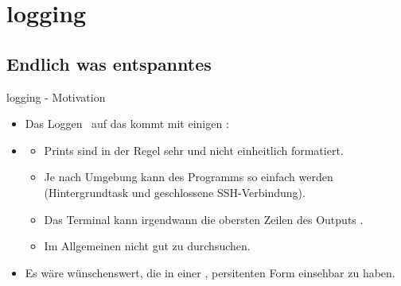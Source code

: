 \documentclass[12pt, aspectratio=169, usepdftitle=false]{beamer}
\newcommand{\pp}[1]{\lpl{#1}}
\begin{document}
\framecardfragen

\section{logging}
\subsection{Endlich was entspanntes}
\begin{frame}{logging - Motivation}
    \begin{itemize}
        \item Das \glqq Loggen\grqq~ auf das  kommt mit einigen :
        \pause
        \item[] \begin{itemize}
            \item Prints sind in der Regel sehr  und nicht einheitlich formatiert.
            \pause
            \item Je nach Umgebung kann \pp{stdout} des Programms  so einfach  werden (Hintergrundtask und geschlossene SSH-Verbindung).
            \pause
            \item Das Terminal kann irgendwann die obersten Zeilen des Outputs .
            \pause
            \item Im Allgemeinen nicht gut zu durchsuchen.
            \pause
        \end{itemize}
    \item Es wäre wünschenswert, die  in einer , persitenten Form einsehbar zu haben.
        
    \end{itemize}
\end{frame}
\end{document}
